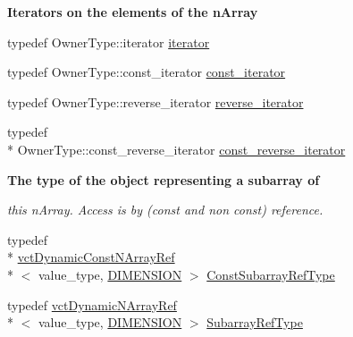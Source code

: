 \begin{Indent}{\bf Iterators on the elements of the n\-Array}\par
\begin{DoxyCompactItemize}
\item 
typedef Owner\-Type\-::iterator \hyperlink{classvct_dynamic_const_n_array_base_a0d7eee16dd05c2f5757640b3617cac5d}{iterator}
\item 
typedef Owner\-Type\-::const\-\_\-iterator \hyperlink{classvct_dynamic_const_n_array_base_a026881a1dc4be02626681c9c3056395b}{const\-\_\-iterator}
\item 
typedef Owner\-Type\-::reverse\-\_\-iterator \hyperlink{classvct_dynamic_const_n_array_base_a028c350d6f74e002681cce4239dfdbc1}{reverse\-\_\-iterator}
\item 
typedef \\*
Owner\-Type\-::const\-\_\-reverse\-\_\-iterator \hyperlink{classvct_dynamic_const_n_array_base_a133cecf87f369296ad391ce3b697466b}{const\-\_\-reverse\-\_\-iterator}
\end{DoxyCompactItemize}
\end{Indent}
\begin{Indent}{\bf The type of the object representing a subarray of}\par
{\em this n\-Array. Access is by (const and non const) reference. }\begin{DoxyCompactItemize}
\item 
typedef \\*
\hyperlink{classvct_dynamic_const_n_array_ref}{vct\-Dynamic\-Const\-N\-Array\-Ref}\\*
$<$ value\-\_\-type, \hyperlink{classvct_dynamic_const_n_array_base_a815ac316ebc1bb2ab1969d307549826faf759c9ab831ff929b89af4ea2865a378}{D\-I\-M\-E\-N\-S\-I\-O\-N} $>$ \hyperlink{classvct_dynamic_const_n_array_base_a4b3508630e409eda4f0d2f55d17d89a4}{Const\-Subarray\-Ref\-Type}
\item 
typedef \hyperlink{classvct_dynamic_n_array_ref}{vct\-Dynamic\-N\-Array\-Ref}\\*
$<$ value\-\_\-type, \hyperlink{classvct_dynamic_const_n_array_base_a815ac316ebc1bb2ab1969d307549826faf759c9ab831ff929b89af4ea2865a378}{D\-I\-M\-E\-N\-S\-I\-O\-N} $>$ \hyperlink{classvct_dynamic_const_n_array_base_a4db8630795191b1854a5af85b9327ee3}{Subarray\-Ref\-Type}
\end{DoxyCompactItemize}
\end{Indent}

